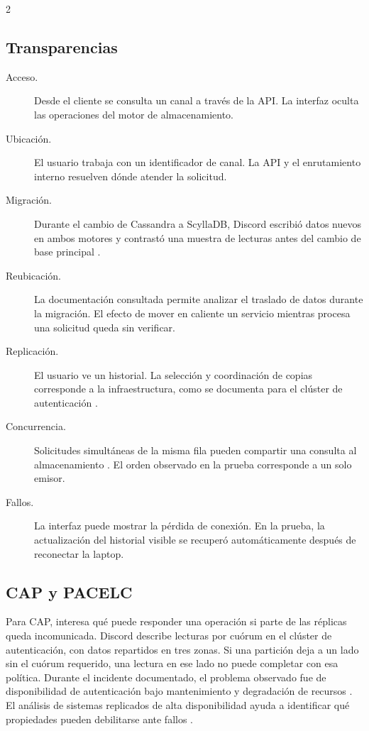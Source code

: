 \documentclass[11pt,a4paper]{article}
\begin{document}
\begin{multicols}{2}
\subsection{Transparencias}
\begin{description}
  \item[Acceso.] Desde el cliente se consulta un canal a través de la
  API. La interfaz oculta las operaciones del motor de almacenamiento.
  \item[Ubicación.] El usuario trabaja con un identificador de canal. La
  API y el enrutamiento interno resuelven dónde atender la solicitud.
  \item[Migración.] Durante el cambio de Cassandra a ScyllaDB, Discord
  escribió datos nuevos en ambos motores y contrastó una muestra de
  lecturas antes del cambio de base principal \cite{ingram2023messages}.
  \item[Reubicación.] La documentación consultada permite analizar el
  traslado de datos durante la migración. El efecto de mover en caliente
  un servicio mientras procesa una solicitud queda sin verificar.
  \item[Replicación.] El usuario ve un historial. La selección y
  coordinación de copias corresponde a la infraestructura, como se
  documenta para el clúster de autenticación \cite{smith2023authOutage}.
  \item[Concurrencia.] Solicitudes simultáneas de la misma fila pueden
  compartir una consulta al almacenamiento \cite{ingram2023messages}.
  El orden observado en la prueba corresponde a un solo emisor.
  \item[Fallos.] La interfaz puede mostrar la pérdida de conexión.
  En la prueba, la actualización del historial visible se recuperó
  automáticamente después de reconectar la laptop.
\end{description}

\subsection{CAP y PACELC}
Para CAP, interesa qué puede responder una operación si parte de las
réplicas queda incomunicada. Discord describe lecturas por cuórum en el
clúster de autenticación, con datos repartidos en tres zonas. Si una
partición deja a un lado sin el cuórum requerido, una lectura en ese
lado no puede completar con esa política. Durante el incidente
documentado, el problema observado fue de disponibilidad de
autenticación bajo mantenimiento y degradación de recursos
\cite{smith2023authOutage}. El análisis de sistemas replicados de alta
disponibilidad ayuda a identificar qué propiedades pueden debilitarse
ante fallos \cite{kokocinski2023correctness}.


\end{multicols}
\end{document}
